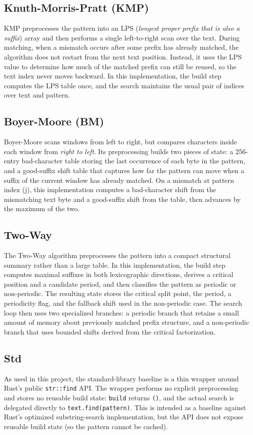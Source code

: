 \documentclass[11pt]{article}
\begin{document}
\subsection{Knuth-Morris-Pratt (KMP)}
KMP preprocesses the pattern into an LPS (\emph{longest proper prefix that is also a suffix}) array and then performs a single left-to-right scan over the text. During matching, when a mismatch occurs after some prefix has already matched, the algorithm does not restart from the next text position. Instead, it uses the LPS value to determine how much of the matched prefix can still be reused, so the text index never moves backward. In this implementation, the build step computes the LPS table once, and the search maintains the usual pair of indices over text and pattern. 

\subsection{Boyer-Moore (BM)}
Boyer-Moore scans windows from left to right, but compares characters inside each window from \emph{right to left}. Its preprocessing builds two pieces of state: a 256-entry bad-character table storing the last occurrence of each byte in the pattern, and a good-suffix shift table that captures how far the pattern can move when a suffix of the current window has already matched. On a mismatch at pattern index (j), this implementation computes a bad-character shift from the mismatching text byte and a good-suffix shift from the table, then advances by the maximum of the two.

\subsection{Two-Way}
The Two-Way algorithm preprocesses the pattern into a compact structural summary rather than a large table. In this implementation, the build step computes maximal suffixes in both lexicographic directions, derives a critical position and a candidate period, and then classifies the pattern as periodic or non-periodic. The resulting state stores the critical split point, the period, a periodicity flag, and the fallback shift used in the non-periodic case. The search loop then uses two specialized branches: a periodic branch that retains a small amount of memory about previously matched prefix structure, and a non-periodic branch that uses bounded shifts derived from the critical factorization. 

\subsection{Std}
As used in this project, the standard-library baseline is a thin wrapper around Rust’s public \verb|str::find| API. The wrapper performs no explicit preprocessing and stores no reusable build state: \verb|build| returns \verb|()|, and the actual search is delegated directly to \verb|text.find(pattern)|. This is intended as a baseline against Rust's optimized substring-search implementation, but the API does not expose reusable build state (so the pattern cannot be cached).
\end{document}
